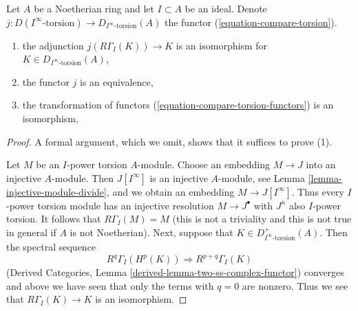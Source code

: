 \begin{lemma}
\label{lemma-local-cohomology-noetherian}
Let $A$ be a Noetherian ring and let $I \subset A$ be an ideal.
Denote $j : D(I^\infty\text{-torsion}) \to D_{I^\infty\text{-torsion}}(A)$
the functor (\ref{equation-compare-torsion}).
\begin{enumerate}
\item the adjunction $j(R\Gamma_I(K)) \to K$ is an isomorphism
for $K \in D_{I^\infty\text{-torsion}}(A)$,
\item the functor $j$ is an equivalence,
\item the transformation of functors
(\ref{equation-compare-torsion-functors}) is an isomorphism,
\end{enumerate}
\end{lemma}

\begin{proof}
A formal argument, which we omit, shows that it suffices to prove (1).

\medskip\noindent
Let $M$ be an $I$-power torsion $A$-module. Choose an embedding
$M \to J$ into an injective $A$-module. Then $J[I^\infty]$ is
an injective $A$-module, see Lemma \ref{lemma-injective-module-divide},
and we obtain an embedding $M \to J[I^\infty]$.
Thus every $I$-power torsion module has an injective resolution
$M \to J^\bullet$ with $J^n$ also $I$-power torsion. It follows
that $R\Gamma_I(M) = M$ (this is not a triviality and this is not
true in general if $A$ is not Noetherian). Next, suppose that
$K \in D_{I^\infty\text{-torsion}}^+(A)$. Then the spectral sequence
$$
R^q\Gamma_I(H^p(K)) \Rightarrow R^{p + q}\Gamma_I(K)
$$
(Derived Categories, Lemma \ref{derived-lemma-two-ss-complex-functor})
converges and above we have seen that only the terms with $q = 0$
are nonzero. Thus we see that $R\Gamma_I(K) \to K$ is an isomorphism.


\end{proof}
